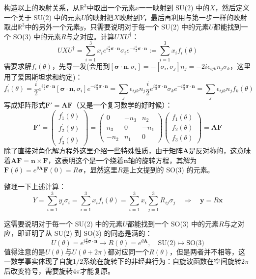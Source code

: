 构造以上的映射关系，从$\mathbb{R}^3$中取出一个元素$x$一一映射到 SU(2) 中的$X$，然后定义一个关于 SU(2) 中的元素$U$的映射把$X$映射到$Y$，最后再利用与第一步一样的映射取出$\mathbb{R}^3$中的另外一个元素$y$，只需要说明对于每一个 SU(2) 中的元素$U$都能找到一个 SO(3) 中的元素$R$与之对应。计算$UXU^\dagger$：
\[UXU^\dagger=\sum_{i=1}^{3}x_ie^{i\frac{\theta}{2}\bm{\sigma}\cdot\bm{n}}\sigma_ie^{-i\frac{\theta}{2}\bm{\sigma}\cdot\bm{n}}:=\sum_{i=1}^{3}x_if_i(\theta)\]
需要求解$f_i(\theta)$，先导一发(会用到$[\bm{\sigma}\cdot\bm{n},\sigma_i]=-[\sigma_i,\sigma_j]n_j=-2i\epsilon_{ijk}n_j\sigma_k$，这里用了爱因斯坦求和约定)：
\[f_i^{\prime}(\theta)=\frac{i}{2}e^{i\frac{\theta}{2}\bm{\sigma}\cdot\bm{n}}[\bm{\sigma}\cdot\bm{n},\sigma_i]e^{-i\frac{\theta}{2}\bm{\sigma}\cdot\bm{n}}=\sum_{j}\epsilon_{ijk}n_j\frac{i}{2}e^{i\frac{\theta}{2}\bm{\sigma}\cdot\bm{n}}\sigma_ke^{-i\frac{\theta}{2}\bm{\sigma}\cdot\bm{n}}=\sum_{j}\epsilon_{ijk}n_jf_k(\theta)\]
写成矩阵形式$\mathbf{F}'=\mathbf{A}\mathbf{F}$（又是一个复习数学的好时候）：
\[\mathbf{F}'=\begin{pmatrix}f_1^{\prime}(\theta)\\f_2^{\prime}(\theta)\\f_3^{\prime}(\theta)\end{pmatrix}=\begin{pmatrix}0&-n_3&n_2\\n_3&0&-n_1\\-n_2&n_1&0\end{pmatrix}\begin{pmatrix}f_1(\theta)\\f_2(\theta)\\f_3(\theta)\end{pmatrix}=\mathbf{A}\mathbf{F}\]
除了直接对角化解方程外这里介绍一些特殊性质，由于矩阵$\mathbf{A}$是反对称的，这意味着$\mathbf{A}\mathbf{F}=\mathbf{n}\times\mathbf{F}$，这表明这个是一个绕着$\mathbf{n}$轴的旋转方程，其解为$\mathbf{F}(\theta)=e^{\theta\mathbf{A}}\mathbf{F}(0)=R\bm{\sigma}$，显然这里$R$是上文提到的 SO(3) 的元素。

整理一下上述计算：
\[Y=\sum_{i=1}^3y_i\sigma_i=\sum_{i=1}^{3}x_if_i(\theta)=\sum_{i=1}^{3}x_i\sum_{j=1}^{3}R_{ij}\sigma_j \quad \Rightarrow \quad \mathbf{y}=R\mathbf{x}\]

这需要说明对于每一个 SU(2) 中的元素$U$都能找到一个 SO(3) 中的元素$R$与之对应，即证明了从 SU(2) 到 SO(3) 的同态是满的：
\[U(\theta)=e^{i\frac{\theta}{2}\bm{\sigma}\cdot\bm{n}} \to R(\theta)=e^{\theta\mathbf{A}}, \quad \text{SU(2)} \mapsto \text{SO(3)}\]
值得注意的是$U(\theta)$与$U(\theta+2\pi)$都对应同一个$R(\theta)$，但是两者并不相等，这一数学事实体现了自旋$1/2$系统在旋转下的非经典行为：自旋波函数在空间旋转$2\pi$后改变符号，需要旋转$4\pi$才能复原。

